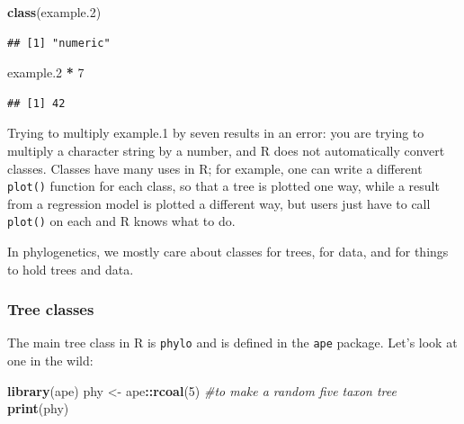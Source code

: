 \documentclass[]{article}
\newenvironment{Shaded}{\begin{snugshade}}{\end{snugshade}}
\newcommand{\CommentTok}[1]{\textcolor[rgb]{0.56,0.35,0.01}{\textit{#1}}}
\newcommand{\DecValTok}[1]{\textcolor[rgb]{0.00,0.00,0.81}{#1}}
\newcommand{\FloatTok}[1]{\textcolor[rgb]{0.00,0.00,0.81}{#1}}
\newcommand{\KeywordTok}[1]{\textcolor[rgb]{0.13,0.29,0.53}{\textbf{#1}}}
\newcommand{\NormalTok}[1]{#1}
\newcommand{\OperatorTok}[1]{\textcolor[rgb]{0.81,0.36,0.00}{\textbf{#1}}}
\newcommand{\StringTok}[1]{\textcolor[rgb]{0.31,0.60,0.02}{#1}}
\theoremstyle{definition}
\theoremstyle{definition}
\theoremstyle{definition}
\theoremstyle{remark}
\begin{document}
\begin{Shaded}
\begin{Highlighting}[]
\KeywordTok{class}\NormalTok{(example}\FloatTok{.2}\NormalTok{)}
\end{Highlighting}
\end{Shaded}

\begin{verbatim}
## [1] "numeric"
\end{verbatim}

\begin{Shaded}
\begin{Highlighting}[]
\NormalTok{example}\FloatTok{.2} \OperatorTok{*}\StringTok{ }\DecValTok{7}
\end{Highlighting}
\end{Shaded}

\begin{verbatim}
## [1] 42
\end{verbatim}

Trying to multiply example.1 by seven results in an error: you are
trying to multiply a character string by a number, and R does not
automatically convert classes. Classes have many uses in R; for example,
one can write a different \texttt{plot()} function for each class, so
that a tree is plotted one way, while a result from a regression model
is plotted a different way, but users just have to call \texttt{plot()}
on each and R knows what to do.

In phylogenetics, we mostly care about classes for trees, for data, and
for things to hold trees and data.

\hypertarget{tree-classes}{%
\subsubsection{Tree classes}\label{tree-classes}}

The main tree class in R is \texttt{phylo} and is defined in the
\texttt{ape} package. Let's look at one in the wild:

\begin{Shaded}
\begin{Highlighting}[]
\KeywordTok{library}\NormalTok{(ape)}
\NormalTok{phy <-}\StringTok{ }\NormalTok{ape}\OperatorTok{::}\KeywordTok{rcoal}\NormalTok{(}\DecValTok{5}\NormalTok{) }\CommentTok{#to make a random five taxon tree}
\KeywordTok{print}\NormalTok{(phy)}
\end{Highlighting}
\end{Shaded}
\end{document}
